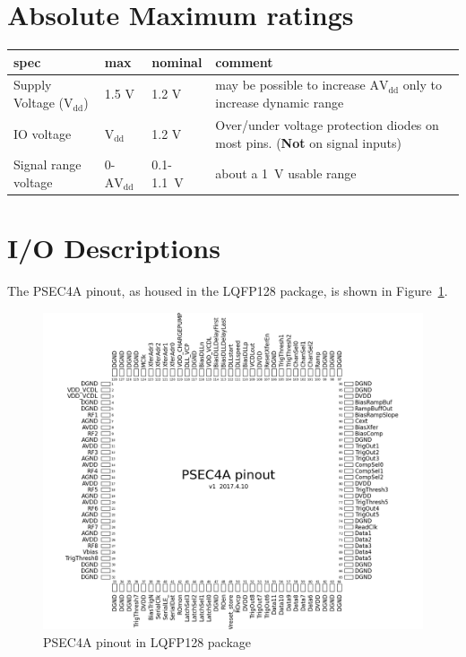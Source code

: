 \documentclass[12pt]{article}
\begin{document}
\section*{Absolute Maximum ratings}
\begin{center}
\begin{tabular}[b!]{l|p{1.4cm}|p{1.7cm}|p{9cm}}
  \hline
   spec       & max & nominal & comment \\ \hline
   Supply Voltage ($\mathrm{V_{dd}}$) &  1.5 V  & 1.2 V  &   may be possible to increase $\mathrm{AV_{dd}}$ only to increase dynamic range\\ \hline
   IO voltage &  $\mathrm{V_{dd}}$ & 1.2 V & Over/under voltage protection diodes on most pins. ({\bf Not} on signal inputs) \\ \hline
   Signal range voltage & 0-$\mathrm{AV_{dd}}$ & 0.1-1.1~V & about a 1~V usable range

\end{tabular}
\end{center}

\newpage
\section*{I/O Descriptions}
The PSEC4A pinout, as housed in the LQFP128 package, is shown in Figure~\ref{fig:pinout}.

\begin{figure}[t!]
    \begin{center}
      \includegraphics[width=18.5cm]{fig/PSEC4a_pinout_LQFP128.png}

    \end{center}
    \caption{PSEC4A pinout in LQFP128 package}
    \label{fig:pinout}
\end{figure}
\end{document}
